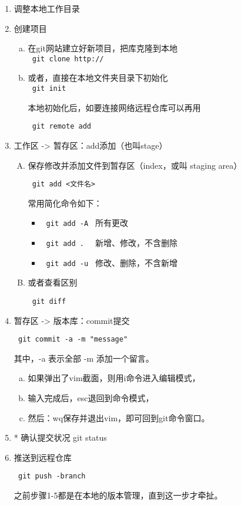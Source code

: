 \documentclass[../Main/thesis]{subfiles}
\begin{document}
\begin{enumerate}[1.]
  \item 调整本地工作目录
  \item 创建项目
  \begin{enumerate}[a.]
    \item 在git网站建立好新项目，把库克隆到本地 \\

    \verb| git clone http:// |

    \item 或者，直接在本地文件夹目录下初始化 \\

    \verb| git init |

    本地初始化后，如要连接网络远程仓库可以再用

    \verb| git remote add |
  \end{enumerate}

  \item 工作区 -> 暂存区：add添加（也叫stage）
    \begin{enumerate}[A.]
      \item 保存修改并添加文件到暂存区（index，或叫 staging area）

      \verb| git add <文件名> |

      常用简化命令如下：
        \begin{itemize}[\textbullet]
          \item \verb| git add -A | 所有更改
          \item \verb| git add .  | 新增、修改，不含删除
          \item \verb| git add -u | 修改、删除，不含新增
        \end{itemize}

      \item 或者查看区别

      \verb! git diff !
    \end{enumerate}

  \item 暂存区 -> 版本库：commit提交

  \verb| git commit -a -m "message" |

  其中，-a 表示全部 -m 添加一个留言。
  \begin{enumerate}[(a)]
    \item 如果弹出了vim截面，则用i命令进入编辑模式，
    \item 输入完成后，esc退回到命令模式，
    \item 然后：wq保存并退出vim，即可回到git命令窗口。
  \end{enumerate}

  \item * 确认提交状况  git status

  \item 推送到远程仓库

  \verb| git push -branch |

  之前步骤1-5都是在本地的版本管理，直到这一步才牵扯。
\end{enumerate}
\end{document}
